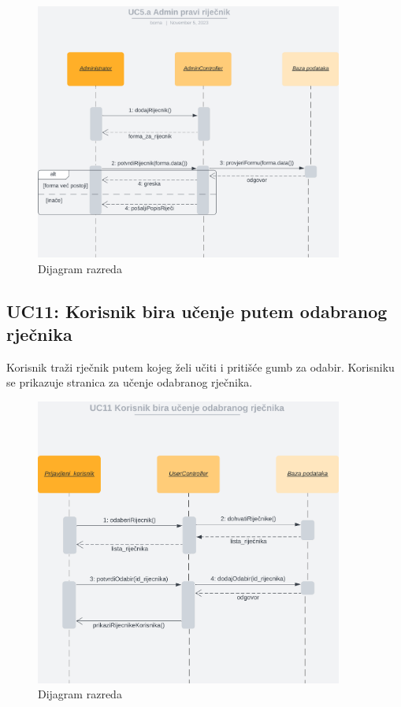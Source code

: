 				\begin{figure}[H]
					\includegraphics[width=0.9\textwidth]{dijagrami/UC5.png} 
					\centering
					\caption{Dijagram razreda}
					\label{fig:class_diagram}
				\end{figure}	
				\eject

				\subsection*{UC11: Korisnik bira učenje putem odabranog rječnika}

				Korisnik traži rječnik putem kojeg želi učiti i pritišće gumb za odabir. Korisniku se prikazuje stranica za učenje odabranog rječnika.\\
				\begin{figure}[H]
					\includegraphics[width=0.9\textwidth]{dijagrami/UC11.png} 
					\centering
					\caption{Dijagram razreda}
					\label{fig:class_diagram}
				\end{figure}	
				\eject

